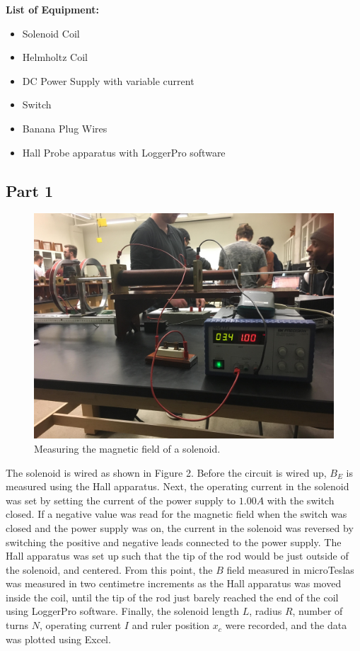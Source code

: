 \documentclass[letterpaper]{article}
\begin{document}


\textbf{List of Equipment:}
\begin{itemize}
  \item Solenoid Coil
  \item Helmholtz Coil
  \item DC Power Supply with variable current
  \item Switch
  \item Banana Plug Wires
  \item Hall Probe apparatus with LoggerPro software
\end{itemize}

\subsection{Part 1}

\begin{figure}[H]
    \centering
    \includegraphics[width=.6\textwidth]{p1-1.jpg}
    \caption{Measuring the magnetic field of a solenoid.}
\end{figure}

The solenoid is wired as shown in Figure 2. Before the circuit is wired up,
$B_E$ is measured using the Hall apparatus. Next, the operating current in the solenoid
was set by setting the current of the power supply to $1.00 A$ with the switch closed.
If a negative value was read for the magnetic field when the switch was
closed and the power supply was on, the current in the solenoid was reversed by switching the
positive and negative leads connected to the power supply. The Hall apparatus
was set up such that the tip of the rod would be just outside of the solenoid,
and centered. From this point, the $B$ field measured in microTeslas was measured
in two centimetre increments as the Hall apparatus was moved inside the coil, until the
tip of the rod just barely reached the end of the coil using LoggerPro software.
Finally, the solenoid length $L$, radius $R$, number of turns $N$, operating current $I$
and ruler position $x_c$ were recorded, and the data was plotted using Excel.
\end{document}
